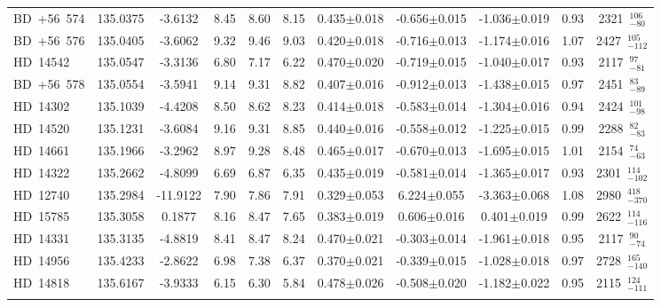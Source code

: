 {\begin{longtable}{lcccccccccc}
BD~+56~574 & 135.0375 & -3.6132 & 8.45 & 8.60 & 8.15 & 0.435$\pm$0.018 & -0.656$\pm$0.015 & -1.036$\pm$0.019 & 0.93 & 2321~$_{-80}^{106}$ \\
\noalign{\smallskip}
BD~+56~576 & 135.0405 & -3.6062 & 9.32 & 9.46 & 9.03 & 0.420$\pm$0.018 & -0.716$\pm$0.013 & -1.174$\pm$0.016 & 1.07 & 2427~$_{-112}^{105}$ \\
\noalign{\smallskip}
HD~14542 & 135.0547 & -3.3136 & 6.80 & 7.17 & 6.22 & 0.470$\pm$0.020 & -0.719$\pm$0.015 & -1.040$\pm$0.017 & 0.93 & 2117~$_{-81}^{97}$ \\
\noalign{\smallskip}
BD~+56~578 & 135.0554 & -3.5941 & 9.14 & 9.31 & 8.82 & 0.407$\pm$0.016 & -0.912$\pm$0.013 & -1.438$\pm$0.015 & 0.97 & 2451~$_{-89}^{83}$ \\
\noalign{\smallskip}
HD~14302 & 135.1039 & -4.4208 & 8.50 & 8.62 & 8.23 & 0.414$\pm$0.018 & -0.583$\pm$0.014 & -1.304$\pm$0.016 & 0.94 & 2424~$_{-98}^{101}$ \\
\noalign{\smallskip}
HD~14520 & 135.1231 & -3.6084 & 9.16 & 9.31 & 8.85 & 0.440$\pm$0.016 & -0.558$\pm$0.012 & -1.225$\pm$0.015 & 0.99 & 2288~$_{-83}^{82}$ \\
\noalign{\smallskip}
HD~14661 & 135.1966 & -3.2962 & 8.97 & 9.28 & 8.48 & 0.465$\pm$0.017 & -0.670$\pm$0.013 & -1.695$\pm$0.015 & 1.01 & 2154~$_{-63}^{74}$ \\
\noalign{\smallskip}
HD~14322 & 135.2662 & -4.8099 & 6.69 & 6.87 & 6.35 & 0.435$\pm$0.019 & -0.581$\pm$0.014 & -1.365$\pm$0.017 & 0.93 & 2301~$_{-102}^{114}$ \\
\noalign{\smallskip}
HD~12740 & 135.2984 & -11.9122 & 7.90 & 7.86 & 7.91 & 0.329$\pm$0.053 & 6.224$\pm$0.055 & -3.363$\pm$0.068 & 1.08 & 2980~$_{-370}^{418}$ \\
\noalign{\smallskip}
HD~15785 & 135.3058 & 0.1877 & 8.16 & 8.47 & 7.65 & 0.383$\pm$0.019 & 0.606$\pm$0.016 & 0.401$\pm$0.019 & 0.99 & 2622~$_{-116}^{114}$ \\
\noalign{\smallskip}
HD~14331 & 135.3135 & -4.8819 & 8.41 & 8.47 & 8.24 & 0.470$\pm$0.021 & -0.303$\pm$0.014 & -1.961$\pm$0.018 & 0.95 & 2117~$_{-74}^{90}$ \\
\noalign{\smallskip}
HD~14956 & 135.4233 & -2.8622 & 6.98 & 7.38 & 6.37 & 0.370$\pm$0.021 & -0.339$\pm$0.015 & -1.028$\pm$0.018 & 0.97 & 2728~$_{-140}^{165}$ \\
\noalign{\smallskip}
HD~14818 & 135.6167 & -3.9333 & 6.15 & 6.30 & 5.84 & 0.478$\pm$0.026 & -0.508$\pm$0.020 & -1.182$\pm$0.022 & 0.95 & 2115~$_{-111}^{124}$ \\
\noalign{\smallskip}

\end{longtable}}
